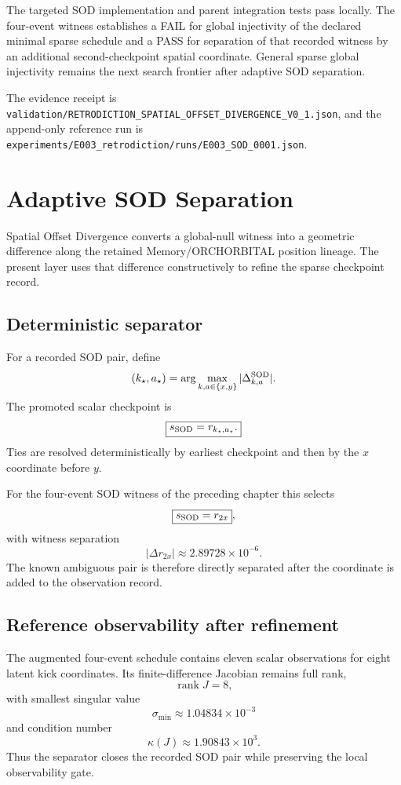 \documentclass[11pt]{book}
\begin{document}
The targeted SOD implementation and parent integration tests pass locally. The four-event witness establishes a FAIL for global injectivity of the declared minimal sparse schedule and a PASS for separation of that recorded witness by an additional second-checkpoint spatial coordinate. General sparse global injectivity remains the next search frontier after adaptive SOD separation.

The evidence receipt is
\texttt{validation/RETRODICTION\_SPATIAL\_OFFSET\_DIVERGENCE\_V0\_1.json},
and the append-only reference run is
\texttt{experiments/E003\_retrodiction/runs/E003\_SOD\_0001.json}.

\chapter{Adaptive SOD Separation}

Spatial Offset Divergence converts a global-null witness into a geometric difference along the retained Memory/ORCHORBITAL position lineage. The present layer uses that difference constructively to refine the sparse checkpoint record.

\section{Deterministic separator}

For a recorded SOD pair, define
\[
(k_\star,a_\star)=\arg\max_{k,a\in\{x,y\}}|\Delta^{\rm SOD}_{k,a}|.
\]
The promoted scalar checkpoint is
\[
\boxed{s_{\rm SOD}=r_{k_\star,a_\star}.}
\]
Ties are resolved deterministically by earliest checkpoint and then by the $x$ coordinate before $y$.

For the four-event SOD witness of the preceding chapter this selects
\[
\boxed{s_{\rm SOD}=r_{2x}},
\]
with witness separation
\[
|\Delta r_{2x}|\approx2.89728\times10^{-6}.
\]
The known ambiguous pair is therefore directly separated after the coordinate is added to the observation record.

\section{Reference observability after refinement}

The augmented four-event schedule contains eleven scalar observations for eight latent kick coordinates. Its finite-difference Jacobian remains full rank,
\[
\operatorname{rank}J=8,
\]
with smallest singular value
\[
\sigma_{\min}\approx1.04834\times10^{-3}
\]
and condition number
\[
\kappa(J)\approx1.90843\times10^3.
\]
Thus the separator closes the recorded SOD pair while preserving the local observability gate.
\end{document}
